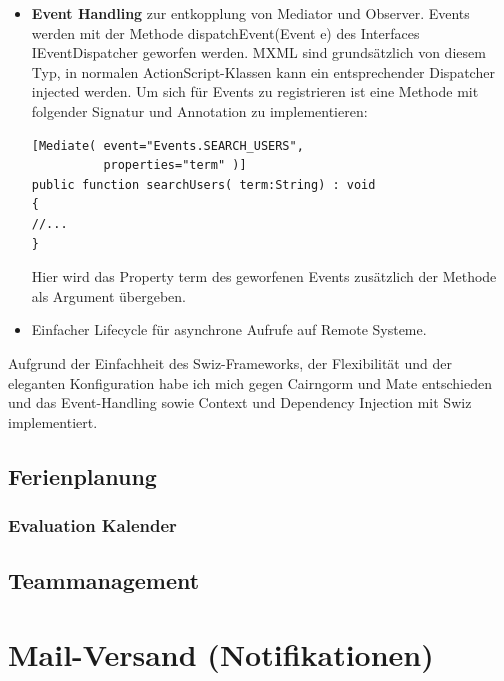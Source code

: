\begin{itemize}
\begin{itemize}
Objekte k\"onnen nun in beliebeigen MXML-Dateien oder ActionScript Klassen injected werden - selbst two-way Bindings sind m\"oglich:
\begin{lstlisting}[caption=Swiz: Bean Injection]
[Inject(source="context.selectedTeam", 
        bind="true",
        twoWay="true")]
public var selectedTeam:Team = null;
\end{lstlisting}
\item \textbf{Event Handling} zur entkopplung von Mediator und Observer. Events werden mit der Methode dispatchEvent(Event e) des Interfaces IEventDispatcher geworfen werden. MXML sind grunds\"atzlich von diesem Typ, in normalen ActionScript-Klassen kann ein entsprechender Dispatcher injected werden. Um sich f\"ur Events zu registrieren ist eine Methode mit folgender Signatur und Annotation zu implementieren:

\begin{lstlisting}[caption=Swiz: Event Observer]
[Mediate( event="Events.SEARCH_USERS", 
          properties="term" )]
public function searchUsers( term:String) : void
{
//...
}
\end{lstlisting}
Hier wird das Property term des geworfenen Events zus\"atzlich der Methode als Argument \"ubergeben.
\item Einfacher Lifecycle f\"ur asynchrone Aufrufe auf Remote Systeme.
\end{itemize}
\end{itemize}

Aufgrund der Einfachheit des Swiz-Frameworks, der Flexibilit\"at und der eleganten Konfiguration habe ich mich gegen Cairngorm und Mate entschieden und das Event-Handling sowie Context und Dependency Injection mit Swiz implementiert.


\subsection{Ferienplanung}\label{implementation:ferienplanung}
\subsubsection{Evaluation Kalender}
\subsection{Teammanagement}\label{implementation:teammanagement}

\section{Mail-Versand (Notifikationen)}




